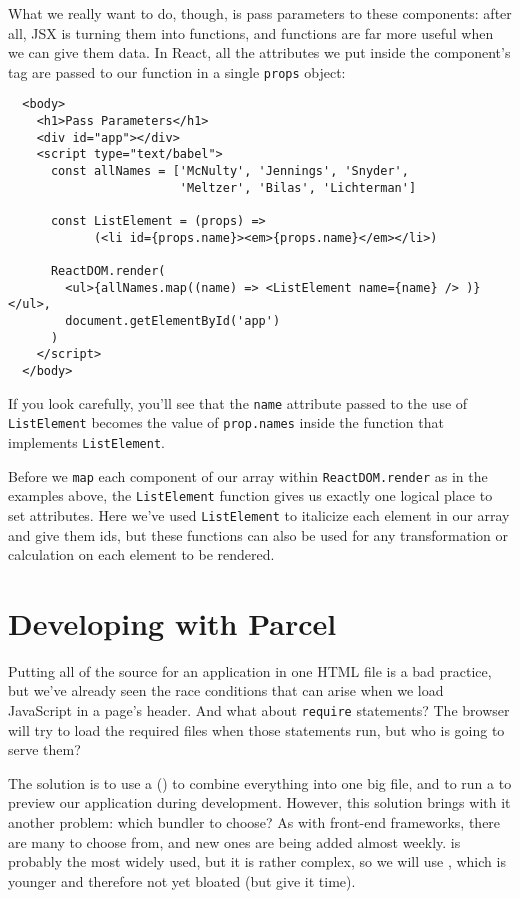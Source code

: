 What we really want to do,
though,
is pass parameters to these components:
after all,
JSX is turning them into functions,
and functions are far more useful when we can give them data.
In React,
all the attributes we put inside the component's tag
are passed to our function in
a single \texttt{props} object:

\begin{verbatim}
  <body>
    <h1>Pass Parameters</h1>
    <div id="app"></div>
    <script type="text/babel">
      const allNames = ['McNulty', 'Jennings', 'Snyder',
                        'Meltzer', 'Bilas', 'Lichterman']

      const ListElement = (props) =>
            (<li id={props.name}><em>{props.name}</em></li>)

      ReactDOM.render(
        <ul>{allNames.map((name) => <ListElement name={name} /> )}</ul>,
        document.getElementById('app')
      )
    </script>
  </body>
\end{verbatim}

If you look carefully,
you'll see that the \texttt{name} attribute passed to the use of \texttt{ListElement}
becomes the value of \texttt{prop.names} inside the function that implements \texttt{ListElement}.

Before we \texttt{map} each component of our array within \texttt{ReactDOM.render} 
as in the examples above, the \texttt{ListElement} function gives us exactly one logical place to set attributes.
Here we've used \texttt{ListElement} to italicize each element in our array and give them ids,
but these functions can also be used for any transformation or calculation on each element to be rendered.

\section{Developing with Parcel}\label{s:dynamic-parcel}

Putting all of the source for an application in one HTML file is a bad practice,
but we've already seen the race conditions that can arise when we load JavaScript in a page's header.
And what about \texttt{require} statements?
The browser will try to load the required files when those statements run,
but who is going to serve them?

The solution is to use a  () 
to combine everything into one big file,
and to run a  to preview our application during development.
However,
this solution brings with it another problem:
which bundler to choose?
As with front-end frameworks,
there are many to choose from,
and new ones are being added almost weekly.
 is probably the most widely used,
but it is rather complex,
so we will use ,
which is younger and therefore not yet bloated
(but give it time).

